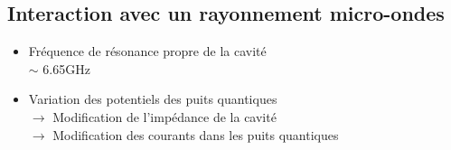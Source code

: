 \documentclass[10pt,a9paper,handout]{beamer} \usepackage[utf8]{inputenc} \usepackage[francais]{babel} \usepackage[T1]{fontenc}
\begin{document}
\subsection{Interaction avec un rayonnement micro-ondes}
\begin{frame}
\begin{itemize}
    \item Fréquence de résonance propre de la cavité\\
        $\sim$ 6.65GHz
    \item Variation des potentiels des puits quantiques\\
    $\rightarrow$ Modification de l'impédance de la cavité\\
    $\rightarrow$ Modification des courants dans les puits quantiques
\end{itemize}


\end{frame}
\end{document}
